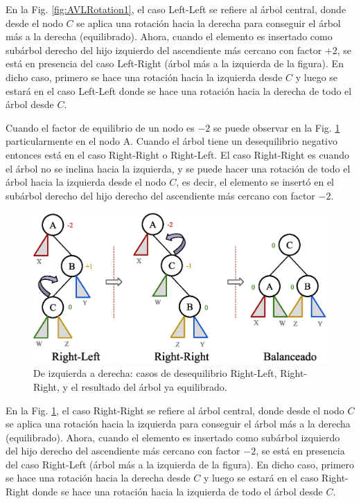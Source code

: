 En la Fig. \ref{fig:AVLRotation1}, el caso Left-Left se refiere al árbol central, donde desde el nodo $C$ se aplica una rotación hacia la derecha para conseguir el árbol más a la derecha (equilibrado). Ahora, cuando el elemento es insertado como subárbol derecho del hijo izquierdo del ascendiente más cercano con factor $+2$, se está en presencia del caso Left-Right (árbol más a la izquierda de la figura). En dicho caso, primero se hace una rotación hacia la izquierda desde $C$ y luego se estará en el caso Left-Left donde se hace una rotación hacia la derecha de todo el árbol desde $C$.

Cuando el factor de equilibrio de un nodo es $-2$ se puede observar en la Fig. \ref{fig:AVLRotation2} particularmente en el nodo A. Cuando el árbol tiene un desequilibrio negativo entonces está en el caso Right-Right o Right-Left. El caso Right-Right es cuando el árbol no se inclina hacia la izquierda, y se puede hacer una rotación de todo el árbol hacia la izquierda desde el nodo $C$, es decir, el elemento se insertó en el subárbol derecho del hijo derecho del ascendiente más cercano con factor $-2$.

\begin{figure}[htpb!]
  \begin{center}
    \includegraphics[width=1.0\textwidth]{images/AVLRotation2.eps}
  \end{center}
  \caption{De izquierda a derecha: casos de desequilibrio Right-Left, Right-Right, y el resultado del árbol ya equilibrado.}
  \label{fig:AVLRotation2}
\end{figure}

En la Fig. \ref{fig:AVLRotation2}, el caso Right-Right se refiere al árbol central, donde desde el nodo $C$ se aplica una rotación hacia la izquierda para conseguir el árbol más a la derecha (equilibrado). Ahora, cuando el elemento es insertado como subárbol izquierdo del hijo derecho del ascendiente más cercano con factor $-2$, se está en presencia del caso Right-Left (árbol más a la izquierda de la figura). En dicho caso, primero se hace una rotación hacia la derecha desde $C$ y luego se estará en el caso Right-Right donde se hace una rotación hacia la izquierda de todo el árbol desde $C$.

